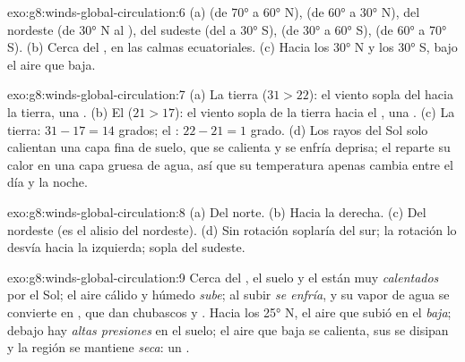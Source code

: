 \begin{solution}{exo:g8:winds-global-circulation:6}
(a)  (de \ang{70} a \ang{60} N), 
(de \ang{60} a \ang{30} N),  del nordeste (de \ang{30} N al
),  del sudeste (del  a \ang{30} S), 
(de \ang{30} a \ang{60} S),  (de \ang{60} a
\ang{70} S). (b) Cerca del , en las calmas ecuatoriales. (c) Hacia
los \ang{30} N y los \ang{30} S, bajo el aire que baja.
\end{solution}

\begin{solution}{exo:g8:winds-global-circulation:7}
(a) La tierra ($31 > 22$): el viento sopla del  hacia la tierra, una
. (b) El  ($21 > 17$): el viento sopla de la tierra hacia
el , una . (c) La tierra: $31 - 17 = 14$ grados; el : $22 -
21 = 1$ grado. (d) Los rayos del Sol solo calientan una capa fina de suelo,
que se calienta y se enfría deprisa; el  reparte su calor en una capa
gruesa de agua, así que su temperatura apenas cambia entre el día y la
noche.
\end{solution}

\begin{solution}{exo:g8:winds-global-circulation:8}
(a) Del norte. (b) Hacia la derecha. (c) Del nordeste (es el alisio del
nordeste). (d) Sin rotación soplaría del sur; la rotación lo desvía hacia
la izquierda; sopla del sudeste.
\end{solution}

\begin{solution}{exo:g8:winds-global-circulation:9}
Cerca del , el suelo y el  están muy \emph{calentados} por el
Sol; el aire cálido y húmedo \emph{sube}; al subir \emph{se enfría}, y su
vapor de agua se convierte en \emph{}, que dan chubascos y .
Hacia los \ang{25} N, el aire que subió en el  \emph{baja}; debajo
hay \emph{altas presiones} en el suelo; el aire que baja se calienta, sus  se disipan y la región se mantiene
\emph{seca}: un .
\end{solution}

